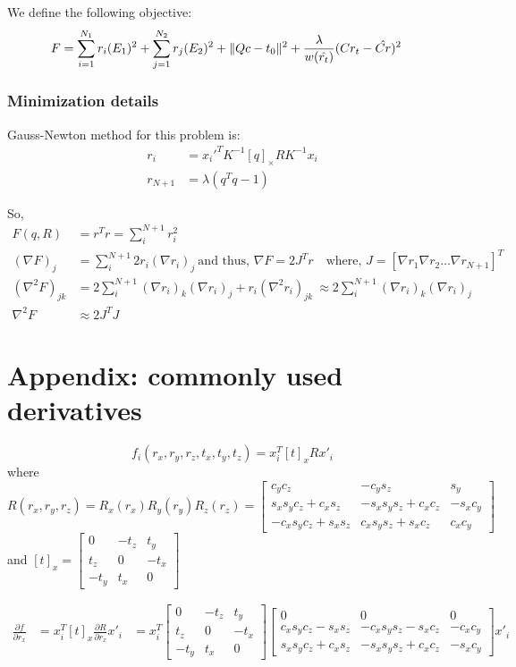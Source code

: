 \documentclass[10pt]{article}         %
\DeclarePairedDelimiter\norm{\lVert}{\rVert}%
\begin{document}
We define the following objective:
\begin{align*}
  F &= \sum_{i=1}^{N_1}{ r_i(E_1)^2 } + \sum_{j=1}^{N_2}{ r_j(E_2)^2 }
  + \norm{Qc-t_0}^2 + \frac{\lambda}{w(\hat{r_t})}(Cr_t - \hat{Cr})^2
\end{align*}

\subsubsection{Minimization details}

Gauss-Newton method for this problem is:
\begin{align*}
  r_i &= x_i'^TK^{-1}[q]_{\times}RK^{-1}x_i\\
  r_{N+1} &= \lambda(q^Tq-1)
\end{align*}

So,
\begin{align*}
  F(q,R) &= r^Tr = \sum_i^{N+1} r_i^2\\
  (\nabla F)_j& = \sum_i^{N+1} 2 r_i (\nabla r_i)_j\ \text{and thus, } \nabla F = 2J^Tr\quad\text{where, } J=[\nabla r_1 \nabla r_2 \ldots \nabla r_{N+1}]^T\\
  (\nabla^2 F)_{jk} &= 2\sum_i^{N+1} (\nabla r_i)_k (\nabla r_i)_j+r_i(\nabla^2 r_i)_{jk}\ \approx 2\sum_i^{N+1} (\nabla r_i)_k (\nabla r_i)_j\\
  \nabla^2 F &\approx 2J^TJ
\end{align*}

\section{Appendix: commonly used derivatives}
\[
f_i(r_x,r_y,r_z,t_x,t_y,t_z) = x_i^T[t]_xRx'_i
\]
where
\[
R(r_x,r_y,r_z)=R_x(r_x)R_y(r_y)R_z(r_z)=
\begin{bmatrix}
  c_yc_z & -c_ys_z &s_y\\
  s_xs_yc_z+c_xs_z &-s_xs_ys_z+c_xc_z &-s_xc_y\\
  -c_xs_yc_z+s_xs_z &c_xs_ys_z+s_xc_z &c_xc_y
\end{bmatrix}
\] 
and $[t]_x=\begin{bmatrix}0 &-t_z &t_y\\t_z &0 &-t_x\\-t_y &t_x
  &0\end{bmatrix}$

\begin{align*}
  \frac{\partial f}{\partial r_x} 
  &= x_i^T[t]_x\frac{\partial R}{\partial r_x}x'_i
  &= x_i^T\begin{bmatrix} 0 &-t_z &t_y\\t_z &0 &-t_x\\-t_y &t_x &0 \end{bmatrix}
  \begin{bmatrix} 0 & 0 &0\\c_xs_yc_z-s_xs_z &-c_xs_ys_z-s_xc_z &-c_xc_y\\
    s_xs_yc_z+c_xs_z &-s_xs_ys_z+c_xc_z &-s_xc_y \end{bmatrix}x'_i
\end{align*}
\end{document}

